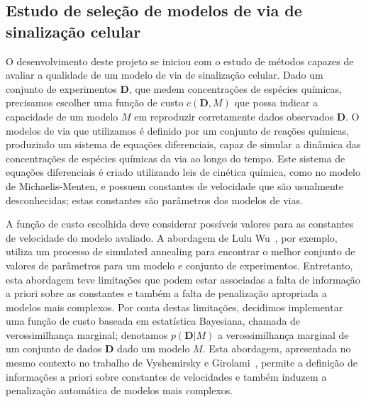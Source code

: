 \documentclass[12pt]{article}
\begin{document}
\subsection{Estudo de seleção de modelos de via de sinalização celular}
O desenvolvimento deste projeto se iniciou com o estudo de métodos
capazes de avaliar a qualidade de um modelo de via de sinalização 
celular. Dado um conjunto de experimentos $\mathbf{D}$, que medem
concentrações de espécies químicas, precisamos escolher uma função de
custo $c (\mathbf{D}, M)$ que possa indicar a capacidade de um modelo
$M$ em reproduzir corretamente dados observados $\mathbf{D}$. O modelos
de via que utilizamos é definido por um conjunto de reações químicas,
produzindo um sistema de equações diferenciais, capaz de simular a
dinâmica das concentrações de espécies químicas da via ao longo do
tempo. Este sistema de equações diferenciais é criado utilizando leis de
cinética química, como no modelo de Michaelis-Menten, e possuem
constantes de velocidade que são usualmente desconhecidas; estas
constantes são parâmetros dos modelos de vias.

A função de custo escolhida deve considerar possíveis valores para as
constantes de velocidade do modelo avaliado. A abordagem de Lulu
Wu~\cite{Wu2015metodo}, por exemplo, utiliza um processo de simulated
annealing para encontrar o melhor conjunto de valores de parâmetros para
um modelo e conjunto de experimentos. Entretanto, esta abordagem teve
limitações que podem estar associadas a falta de informação a priori
sobre as constantes e também a falta de penalização apropriada a modelos
mais complexos. Por conta destas limitações, decidimos implementar uma
função de custo baseada em estatística Bayesiana, chamada de
verossimilhança marginal; denotamos $p (\mathbf{D} | M)$ a 
verossimilhança marginal de um conjunto de dados $\mathbf{D}$ dado um 
modelo $M$. Esta abordagem, apresentada no mesmo contexto no trabalho de 
Vyshemirsky e Girolami~\cite{Vyshemirsky2008}, permite a definição de 
informações a priori sobre constantes de velocidades e também induzem a 
penalização automática de modelos mais complexos.

\end{document}
